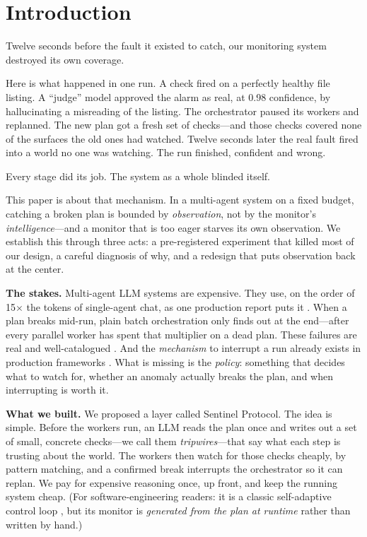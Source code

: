\documentclass[acmsmall,screen]{acmart}
\begin{document}

\maketitle

\section{Introduction}
Twelve seconds before the fault it existed to catch, our monitoring system
destroyed its own coverage.

Here is what happened in one run. A check fired on a perfectly healthy file
listing. A ``judge'' model approved the alarm as real, at 0.98 confidence, by
hallucinating a misreading of the listing. The orchestrator paused its workers
and replanned. The new plan got a fresh set of checks---and those checks
covered none of the surfaces the old ones had watched. Twelve seconds later the
real fault fired into a world no one was watching. The run finished, confident
and wrong.

Every stage did its job. The system as a whole blinded itself.

This paper is about that mechanism. In a multi-agent system on a fixed budget,
catching a broken plan is bounded by \emph{observation}, not by the monitor's
\emph{intelligence}---and a monitor that is too eager starves its own
observation. We establish this through three acts: a pre-registered experiment
that killed most of our design, a careful diagnosis of why, and a redesign that
puts observation back at the center.

\textbf{The stakes.} Multi-agent LLM systems are expensive. They use, on the
order of 15$\times$ the tokens of single-agent chat, as one production report
puts it \cite{ref27}. When a plan
breaks mid-run, plain batch orchestration only finds out at the end---after
every parallel worker has spent that multiplier on a dead plan. These failures
are real and well-catalogued \cite{ref14, ref16}. And the \emph{mechanism} to
interrupt a run already exists in production frameworks \cite{ref22}. What is
missing is the \emph{policy}: something that decides what to watch for, whether
an anomaly actually breaks the plan, and when interrupting is worth it.

\textbf{What we built.} We proposed a layer called Sentinel Protocol. The idea
is simple. Before the workers run, an LLM reads the plan once and writes out a
set of small, concrete checks---we call them \emph{tripwires}---that say what
each step is trusting about the world. The workers then watch for those checks
cheaply, by pattern matching, and a confirmed break interrupts the orchestrator
so it can replan. We pay for expensive reasoning once, up front, and keep the
running system cheap. (For software-engineering readers: it is a classic
self-adaptive control loop \cite{ref23}, but its monitor is \emph{generated
from the plan at runtime} rather than written by hand.)
\end{document}
